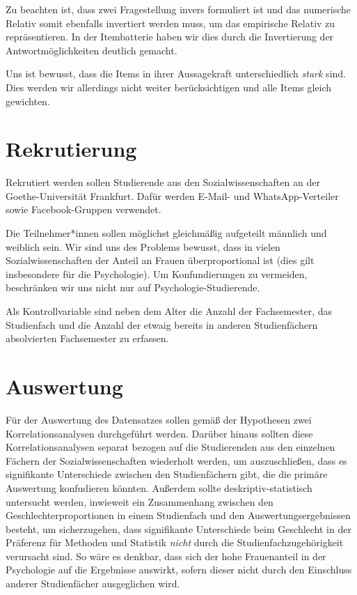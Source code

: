 \documentclass[doc]{apa7}
\begin{document}
Zu beachten ist, dass zwei Fragestellung invers formuliert ist und das numerische Relativ somit ebenfalls invertiert werden muss, um das empirische Relativ zu repräsentieren. In der Itembatterie haben wir dies durch die Invertierung der Antwortmöglichkeiten deutlich gemacht.

Uns ist bewusst, dass die Items in ihrer Aussagekraft unterschiedlich \textit{stark} sind. Dies werden wir allerdings nicht weiter berücksichtigen und alle Items gleich gewichten.

\section{Rekrutierung}
Rekrutiert werden sollen Studierende aus den Sozialwissenschaften an der Goethe-Universität Frankfurt. Dafür werden E-Mail- und WhatsApp-Verteiler sowie Facebook-Gruppen verwendet.

Die Teilnehmer*innen sollen möglichst gleichmäßig aufgeteilt männlich und weiblich sein. Wir sind uns des Problems bewusst, dass in vielen Sozialwissenschaften der Anteil an Frauen überproportional ist (dies gilt insbesondere für die Psychologie). Um Konfundierungen zu vermeiden, beschränken wir uns nicht nur auf Psychologie-Studierende.

Als Kontrollvariable sind neben dem Alter die Anzahl der Fachsemester, das Studienfach und die Anzahl der etwaig bereits in anderen Studienfächern absolvierten Fachsemester zu erfassen. 

\section{Auswertung}
Für der Auswertung des Datensatzes sollen gemäß der Hypothesen zwei Korrelationsanalysen durchgeführt werden. Darüber hinaus sollten diese Korrelationsanalysen separat bezogen auf die Studierenden aus den einzelnen Fächern der Sozialwissenschaften wiederholt werden, um auszuschließen, dass es signifikante Unterschiede zwischen den Studienfächern gibt, die die primäre Auswertung konfudieren könnten. Außerdem sollte deskriptiv-statistisch untersucht werden, inwieweit ein Zusammenhang zwischen den Geschlechterproportionen in einem Studienfach und den Auswertungsergebnissen besteht, um sicherzugehen, dass signifikante Unterschiede beim Geschlecht in der Präferenz für Methoden und Statistik \textit{nicht} durch die Studienfachzugehörigkeit verursacht sind. So wäre es denkbar, dass sich der hohe Frauenanteil in der Psychologie auf die Ergebnisse auswirkt, sofern dieser nicht durch den Einschluss anderer Studienfächer ausgeglichen wird.
\end{document}
